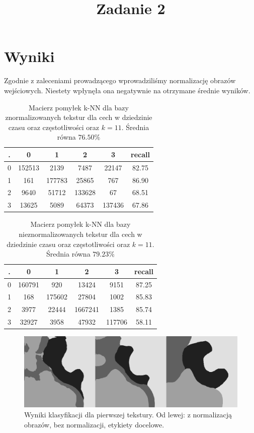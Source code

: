 \documentclass{classrep}
\author{
  \studentinfo{Hubert Marcinkowski}{214942} \and
  \studentinfo{Artur Wróblewski}{214985}
}
\title{Zadanie 2}
\begin{document}
\maketitle

\section{Wyniki}

Zgodnie z zaleceniami prowadzącego wprowadziliśmy normalizację obrazów wejściowych. Niestety wpłynęła ona negatywnie na otrzymane średnie wyników.

\begin{table}[h!]
  \centering
  \caption{Macierz pomyłek k-NN dla bazy znormalizowanych tekstur dla cech w dziedzinie czasu oraz częstotliwości oraz $k=11$. Średnia równa $76.50\%$}
  \label{tab:tab1}
  \begin{tabular}{|c|c|c|c|c|c|}
    \hline
	. & 0 & 1 & 2 & 3 & recall \\
    \hline
	0 & 152513 & 2139 & 7487 & 22147 & 82.75\\
    \hline
	1 & 161 & 177783 & 25865 & 767 & 86.90\\
	\hline
	2 & 9640 & 51712 & 133628 & 67 & 68.51\\
	\hline
	3 & 13625 & 5089 & 64373 & 137436 & 67.86\\   
    \hline
  \end{tabular}
\end{table}

\begin{table}[h!]
  \centering
  \caption{Macierz pomyłek k-NN dla bazy nieznormalizowanych tekstur dla cech w dziedzinie czasu oraz częstotliwości oraz $k=11$. Średnia równa $79.23\%$}
  \label{tab:tab1}
  \begin{tabular}{|c|c|c|c|c|c|}
    \hline
	. & 0 & 1 & 2 & 3 & recall \\
    \hline
	0 & 160791 & 920 & 13424 & 9151 & 87.25\\
    \hline
	1 & 168 & 175602 & 27804 & 1002 & 85.83\\
	\hline
	2 & 3977 & 22444 & 1667241 & 1385 & 85.74\\
	\hline
	3 & 32927 & 3958 & 47932 & 117706 & 58.11\\   
    \hline
  \end{tabular}
\end{table}

\begin{figure}[h!]
	\centering
  	\includegraphics[width=\linewidth]{1.png}
	\caption{Wyniki klasyfikacji dla pierwszej tekstury. Od lewej: z normalizacją obrazów, bez normalizacji, etykiety docelowe.}
	\label{fig:widma}
\end{figure}
\end{document}
